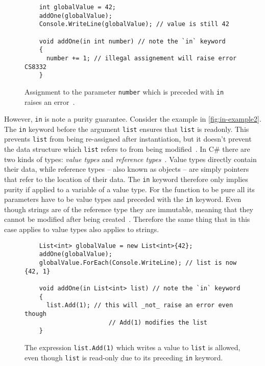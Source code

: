 \documentclass[a4paper,12pt]{article}
\begin{document}
\begin{figure}[H]
  \centering
  \begin{lstlisting}
    int globalValue = 42;
    addOne(globalValue);
    Console.WriteLine(globalValue); // value is still 42

    void addOne(in int number) // note the `in` keyword
    {
      number += 1; // illegal assignement will raise error CS8332
    }
  \end{lstlisting}
  \caption{Assignment to the parameter \texttt{number} which is preceded with \texttt{in} raises an error~\cite{microsoft-in-modifier}.}
  \label{fig:in-example1}
\end{figure}

However, \texttt{in} is note a purity guarantee. Consider the example in \autoref{fig:in-example2}. The \texttt{in} keyword before the argument \texttt{list} ensures that \texttt{list} is readonly. This prevents \texttt{list} from being re-assigned after instantiation, but it doesn't prevent the data structure which \texttt{list} refers to from being modified~\cite{buchanan-static-lists}. In C\# there are two kinds of types: \textit{value types} and \textit{reference types}~\cite{microsoft-types}. Value types directly contain their data, while reference types -- also known as objects -- are simply pointers that refer to the location of their data. The \texttt{in} keyword therefore only implies purity if applied to a variable of a value type. For the function to be pure all its parameters have to be value types and preceded with the \texttt{in} keyword. Even though strings are of the reference type they are immutable, meaning that they cannot be modified after being created~\cite{microsoft-strings}. Therefore the same thing that in this case applies to value types also applies to strings.

\begin{figure}[H]
  \centering
  \begin{lstlisting}
    List<int> globalValue = new List<int>{42};
    addOne(globalValue);
    globalValue.ForEach(Console.WriteLine); // list is now {42, 1}

    void addOne(in List<int> list) // note the `in` keyword
    {
      list.Add(1); // this will _not_ raise an error even though
                       // Add(1) modifies the list
    }
  \end{lstlisting}
  \caption{The expression \texttt{list.Add(1)} which writes a value to \texttt{list} is allowed, even though \texttt{list} is read-only due to its preceding \texttt{in} keyword.}
  \label{fig:in-example2}
\end{figure}
\end{document}
